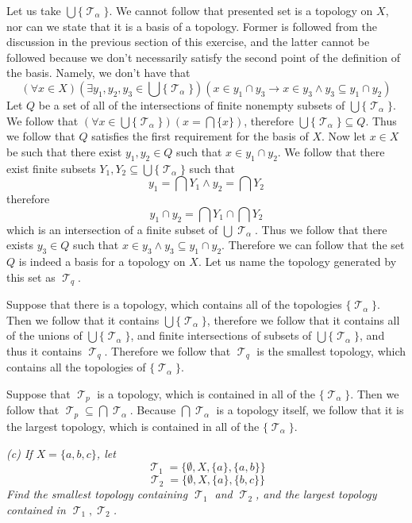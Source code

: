 \documentclass[11pt,oneside,titlepage]{book}
\DeclareMathOperator \topol {\mathcal {T}}
\newcommand{\set}[1]{\{ #1 \}}
\begin{document}
Let us take $\bigcup{\set{\topol_\alpha}}$. We cannot follow that presented
set is a topology on $X$, nor can we state that it is a basis of a topology. Former
is followed from the discussion in the previous section of this exercise, and the latter
cannot be followed because we don't necessarily satisfy the
second point of the definition of the basis. Namely, we don't have that
$$(\forall x \in X)(\exists y_1, y_2, y_3 \in \bigcup{\set{\topol_\alpha}})(x \in y_1 \cap y_3 \to
x \in y_3 \land y_3 \subseteq y_1 \cap y_2)$$
Let $Q$ be a set of all of the intersections of finite nonempty subsets of
$\bigcup{\set{\topol_\alpha}}$. We follow that $(\forall x \in \bigcup{\set{\topol_\alpha}})
(x = \bigcap{\{x\}})$, therefore $\bigcup{\set{\topol_\alpha}} \subseteq Q$. 
Thus we follow that $Q$ satisfies
the first requirement for the basis of $X$. Now let $x \in X$ be such that there
exist $y_1, y_2 \in Q$ such that $x \in y_1 \cap y_2$. We follow that there exist
finite subsets $Y_1, Y_2 \subseteq \bigcup{\set{\topol_\alpha}}$ such that 
$$y_1 = \bigcap{Y_1} \land y_2 = \bigcap{Y_2}$$
therefore
$$y_1 \cap y_2  = \bigcap{Y_1} \cap \bigcap{Y_2}$$
which is an intersection of a finite subset of $\bigcup{\topol_\alpha}$. Thus we follow that there
exists $y_3 \in Q$ such that $x \in y_3 \land y_3 \subseteq y_1 \cap y_2$. 
Therefore we can follow that the set $Q$ is indeed a basis for a topology on $X$.
Let us name the topology generated by this set as $\topol_q$.

Suppose that there is a topology, which contains
all of the topologies $\set{\topol_\alpha}$. Then we follow that it contains
$\bigcup{\set{\topol_\alpha}}$, therefore we follow that it contains all of the unions
of $\bigcup{\set{\topol_\alpha}}$, and finite intersections of subsets of
$\bigcup{\set{\topol_\alpha}}$, and thus it contains $\topol_q$. Therefore
we follow that $\topol_q$ is the smallest topology, which contains all
the topologies of $\set{\topol_\alpha}$.

Suppose that $\topol_p$ is a topology, which is contained in all of the $\set{\topol_\alpha}$.
Then we follow that $\topol_p \subseteq \bigcap{\topol_\alpha}$. Because $\bigcap{\topol_\alpha}$
is a topology itself, we follow that it is the largest topology, which is contained
in all of the $\set{\topol_\alpha}$.

\textit{(c) If $X = \set{a, b, c}$, let
  $$\topol_1 = \set{\emptyset, X, \set{a}, \set{a, b}}$$
  $$\topol_2 = \set{\emptyset, X, \set{a}, \set{b, c}}$$
  Find the smallest topology containing $\topol_1$ and $\topol_2$, and the largest topology
  contained in $\topol_1, \topol_2$.
}
\end{document}
